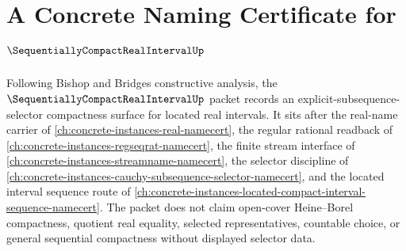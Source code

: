 \chapter{A Concrete Naming Certificate for $\SequentiallyCompactRealIntervalUp$}
\label{ch:concrete-instances-sequentially-compact-real-interval-namecert}

Following Bishop and Bridges constructive analysis, the $\SequentiallyCompactRealIntervalUp$ packet records an explicit-subsequence-selector compactness surface for located real intervals. It sits after the real-name carrier of \autoref{ch:concrete-instances-real-namecert}, the regular rational readback of \autoref{ch:concrete-instances-regseqrat-namecert}, the finite stream interface of \autoref{ch:concrete-instances-streamname-namecert}, the selector discipline of \autoref{ch:concrete-instances-cauchy-subsequence-selector-namecert}, and the located interval sequence route of \autoref{ch:concrete-instances-located-compact-interval-sequence-namecert}. The packet does not claim open-cover Heine--Borel compactness, quotient real equality, selected representatives, countable choice, or general sequential compactness without displayed selector data.

